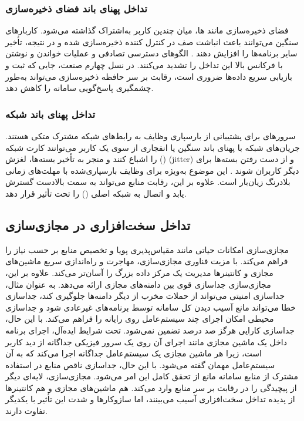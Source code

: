 \subsubsection{تداخل پهنای باند فضای ذخیره‌سازی}

فضای ذخیره‌سازی مانند ها، میان چندین کاربر به‌اشتراک گذاشته می‌شود. کاربارهای سنگین  می‌توانند باعث انباشت صف در کنترل کننده ذخیره‌سازی شده و در نتیجه، تأخیر  سایر برنامه‌ها را افزایش دهند \cite{pu2010iointerference}. الگوهای دسترسی تصادفی و عملیات خواندن و نوشتن با فرکانس بالا این تداخل را تشدید می‌کنند\cite{huang2018ioresource}. در نسل چهارم صنعت، جایی که ثبت و بازیابی سریع داده‌ها ضروری است، رقابت بر سر حافظه ذخیره‌سازی می‌تواند به‌طور چشمگیری پاسخ‌گویی سامانه را کاهش دهد.

\subsubsection{تداخل پهنای باند شبکه}

سرورهای  برای پشتیبانی از بارسپاری وظایف به رابط‌های شبکه مشترک متکی هستند. جریان‌های شبکه با پهنای باند سنگین یا انفجاری از سوی یک کاربر می‌توانند کارت شبکه () را اشباع کنند و منجر به تأخیر بسته‌ها، لغزش (jitter) و از دست رفتن بسته‌ها برای دیگر کاربران شوند \cite{pu2010iointerference}. این موضوع به‌ویژه برای وظایف بارسپاری‌شده با مهلت‌های زمانی بلادرنگ زیان‌بار است. علاوه بر این، رقابت منابع می‌تواند به سمت بالادست گسترش یابد و اتصال به شبکه اصلی () را تحت تأثیر قرار دهد.

\subsection{تداخل سخت‌افزاری در مجازی‌سازی}

مجازی‌سازی امکانات حیاتی مانند مقیاس‌پذیری پویا و تخصیص منابع بر حسب نیاز را فراهم می‌کند. با مزیت فناوری مجازی‌سازی، مهاجرت و راه‌اندازی سریع ماشین‌های مجازی و کانتینرها مدیریت یک مرکز داده بزرگ را آسان‌تر می‌کند. علاوه بر این، مجازی‌سازی جداسازی قوی بین دامنه‌های مجازی ارائه می‌دهد. به عنوان مثال، جداسازی امنیتی می‌تواند از حملات مخرب از دیگر دامنه‌ها جلوگیری کند، جداسازی خطا می‌تواند مانع آسیب دیدن کل سامانه توسط برنامه‌های غیرعادی شود و جداسازی محیطی امکان اجرای چند سیستم‌عامل روی رایانه را فراهم می‌کند. با این حال، جداسازی کارایی هرگز صد درصد تضمین نمی‌شود. تحت شرایط ایده‌آل، اجرای برنامه داخل یک ماشین مجازی مانند اجرای آن روی یک سرور فیزیکی جداگانه از دید کاربر است، زیرا هر ماشین مجازی یک سیستم‌عامل جداگانه اجرا می‌کند که به آن سیستم‌عامل مهمان گفته می‌شود. با این حال، جداسازی ناقص منابع در استفاده مشترک از منابع سامانه مانع از تحقق کامل این امر می‌شود. مجازی‌سازی، لایه‌ای دیگر از پیچیدگی را در رقابت بر سر منابع وارد می‌کند. هم ماشین‌های مجازی و هم کانتینرها از پدیده تداخل سخت‌افزاری آسیب می‌بینند، اما سازوکارها و شدت این تأثیر با یکدیگر تفاوت دارند.

